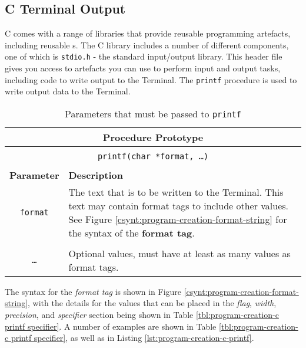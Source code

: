 \clearpage
\subsection{C Terminal Output} %
\label{sub:c_console_output}

C comes with a range of libraries that provide reusable programming artefacts, including reusable s. The C library includes a number of different components, one of which is \texttt{stdio.h} - the standard input/output library. This header file gives you access to artefacts you can use to perform input and output tasks, including code to write output to the Terminal. The \texttt{printf} procedure is used to write output data to the Terminal.

\begin{table}[h]
  \centering
  \begin{tabular}{|c|p{9cm}|}
    \hline
    \multicolumn{2}{|c|}{\textbf{Procedure Prototype}} \\
    \hline
    \multicolumn{2}{|c|}{} \\
    \multicolumn{2}{|c|}{\texttt{printf(char *format, \ldots )}} \\
    \multicolumn{2}{|c|}{} \\
    \hline
    \textbf{Parameter} & \textbf{Description} \\
    \hline
    \texttt{ format } & The text that is to be written to the Terminal. This text may contain format tags to include other values. See Figure \ref{csynt:program-creation-format-string} for the syntax of the \textbf{format tag}. \\
    & \\
    \texttt{\ldots}   & Optional values, must have at least as many values as format tags. \\
    \hline
  \end{tabular}
  \caption{Parameters that must be passed to \texttt{printf}}
  \label{tbl:program-creation-c printf parameters}
\end{table}

The syntax for the \emph{format tag} is shown in Figure \ref{csynt:program-creation-format-string}, with the details for the values that can be placed in the \emph{flag}, \emph{width}, \emph{precision}, and \emph{specifier} section being shown in Table \vref{tbl:program-creation-c printf specifier}. A number of examples are shown in Table \ref{tbl:program-creation-c printf specifier}, as well as in Listing \ref{lst:program-creation-c-printf}.

